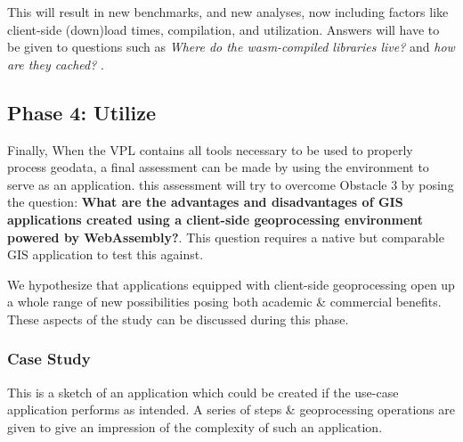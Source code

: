 This will result in new benchmarks, and new analyses, now including factors like client-side (down)load times, compilation, and utilization. Answers will have to be given to questions such as \textit{Where do the wasm-compiled libraries live?} and \textit{ how are they cached? }.





\newpage
\subsection{Phase 4: Utilize}

Finally, When the VPL contains all tools necessary to be used to properly process geodata, a final assessment can be made by using the environment to serve as an application. this assessment will try to overcome Obstacle 3 by posing the question: \textbf{What are the advantages and disadvantages of GIS applications created using a client-side geoprocessing environment powered by WebAssembly?}. This question requires a native but comparable GIS application to test this against.  

We hypothesize that applications equipped with client-side geoprocessing open up a whole range of new possibilities posing both academic \& commercial benefits. 
These aspects of the study can be discussed during this phase. 




\subsubsection*{Case Study}

This is a sketch of an application which could be created if the use-case application performs as intended. A series of steps \& geoprocessing operations are given to give an impression of the complexity of such an application.


